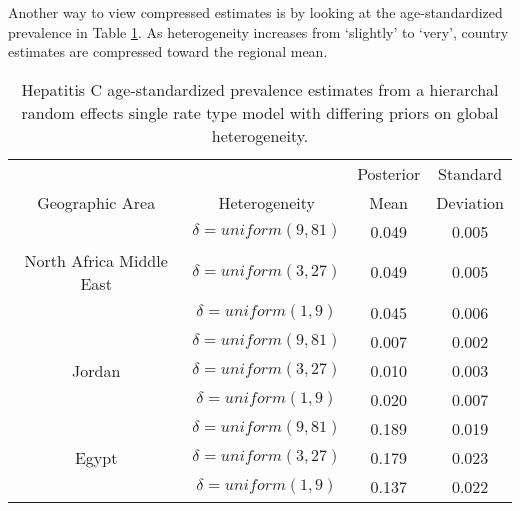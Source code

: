 Another way to view compressed estimates is by looking at the age-standardized prevalence in Table \ref{tab:app-hepc global rfx}.  As heterogeneity increases from `slightly' to `very', country estimates are compressed toward the regional mean.

    \begin{table}[h]
        \begin{center}
        \caption{ Hepatitis C age-standardized prevalence estimates from a hierarchal random effects single rate type model with differing priors on global heterogeneity.}
        \label{tab:app-hepc global rfx}
        \begin{tabular}{|c|c|c|c|}
            \hline
                & & Posterior & Standard \\
                Geographic Area & Heterogeneity & Mean & Deviation \\
            \hline
                & $\delta = uniform(9,81)$ & 0.049 & 0.005 \\
                North Africa Middle East & $\delta = uniform(3,27)$ & 0.049 & 0.005 \\
                & $\delta = uniform(1,9)$ & 0.045 & 0.006 \\
            \hline
                & $\delta = uniform(9,81)$ & 0.007 & 0.002 \\
                Jordan & $\delta = uniform(3,27)$ & 0.010 & 0.003 \\
                & $\delta = uniform(1,9)$ & 0.020 & 0.007 \\
            \hline
                & $\delta = uniform(9,81)$ & 0.189 & 0.019 \\
                Egypt & $\delta = uniform(3,27)$ & 0.179 & 0.023 \\
                & $\delta = uniform(1,9)$ & 0.137 & 0.022 \\
            \hline
        \end{tabular}
        \end{center}
    \end{table}
